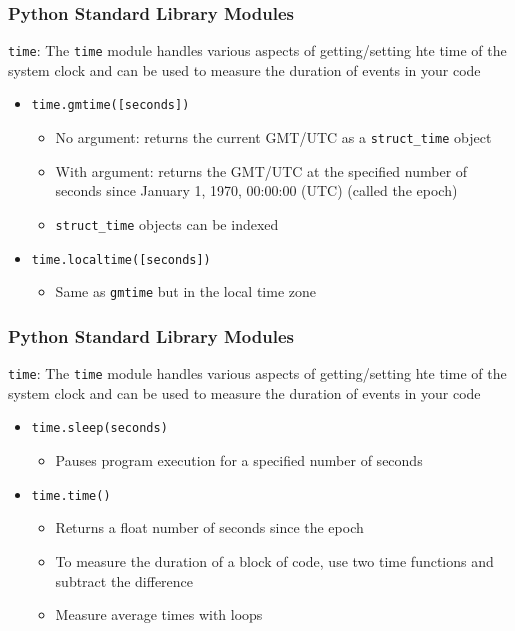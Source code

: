 \documentclass{beamer}
\newcommand{\code}[1]{\texttt{#1}}
\begin{document}
\begin{frame}	
	\frametitle{Python Standard Library Modules}
	
	\begin{block}{\code{time}:}
		The \code{time} module handles various aspects of getting/setting hte time of the system clock and can be used to measure the duration of events in your code
		\begin{itemize}
			\item \code{time.gmtime([seconds])}
			\begin{itemize}
				\item No argument: returns the current GMT/UTC as a \code{struct\_time} object
				\item With argument: returns the GMT/UTC at the specified number of seconds since January 1, 1970, 00:00:00 (UTC) (called the epoch)
				\item \code{struct\_time} objects can be indexed
			\end{itemize}
			\item \code{time.localtime([seconds])}
			\begin{itemize}
				\item Same as \code{gmtime} but in the local time zone
			\end{itemize}
		\end{itemize}
	\end{block}
	
\end{frame}

\begin{frame}	
	\frametitle{Python Standard Library Modules}
	
	\begin{block}{\code{time}:}
		The \code{time} module handles various aspects of getting/setting hte time of the system clock and can be used to measure the duration of events in your code
		\begin{itemize}
			\item \code{time.sleep(seconds)}
			\begin{itemize}
				\item Pauses program execution for a specified number of seconds
			\end{itemize}
			\item \code{time.time()}
			\begin{itemize}
				\item Returns a float number of seconds since the epoch
				\item To measure the duration of a block of code, use two time functions and subtract the difference
				\item Measure average times with loops
			\end{itemize}
		\end{itemize}
	\end{block}
	
\end{frame}
\end{document}

